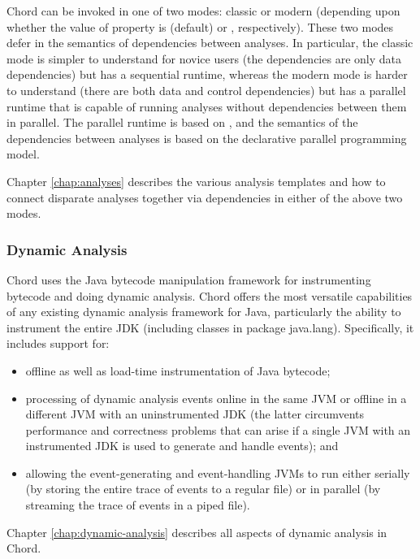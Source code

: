 Chord can be invoked in one of two modes: classic or modern (depending upon whether the value of property
 is  (default) or , respectively).
These two modes defer in the semantics of dependencies between analyses.  In particular, the classic mode
is simpler to understand for novice users (the dependencies are only data dependencies) but has a sequential
runtime, whereas the modern mode is harder to understand (there are both data and control dependencies)
but has a parallel runtime that is capable of running analyses without dependencies between
them in parallel.  The parallel runtime is based on ,
and the semantics of the dependencies between analyses is based on the
 declarative parallel
programming model.

Chapter \ref{chap:analyses} describes the various analysis templates and how to connect disparate analyses
together via dependencies in either of the above two modes.

\subsubsection*{Dynamic Analysis}

Chord uses the  Java bytecode manipulation
framework for instrumenting bytecode and doing dynamic analysis.
Chord offers the most versatile capabilities of any existing dynamic analysis framework
for Java, particularly the ability to instrument the entire JDK (including classes in
package java.lang).
Specifically, it includes support for:
\begin{itemize}
\item
offline as well as load-time instrumentation of Java bytecode;
\item
processing of dynamic analysis events online in the same JVM or offline in a different JVM with an uninstrumented JDK (the latter circumvents performance and correctness problems that can arise if a single JVM with an instrumented JDK is used to generate and handle events); and
\item
allowing the event-generating and event-handling JVMs to run either serially (by storing the entire trace of events to a regular file) or in parallel (by streaming the trace of events in a piped file).
\end{itemize}
Chapter \ref{chap:dynamic-analysis} describes all aspects of dynamic analysis in Chord.

